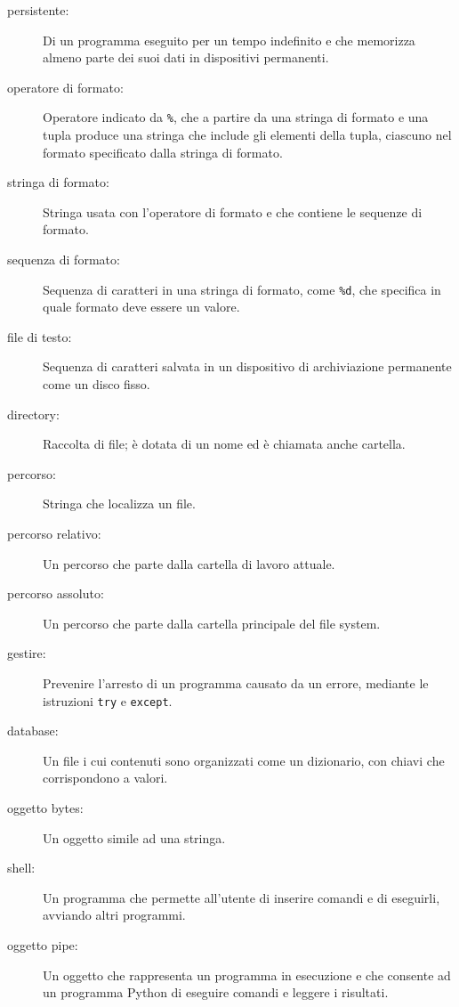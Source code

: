 \documentclass[10pt]{book}
\begin{document}
\begin{description}

\item[persistente:] Di un programma eseguito per un tempo indefinito e che memorizza almeno parte dei suoi dati in dispositivi permanenti.

\item[operatore di formato:] Operatore indicato da {\tt \%}, che a partire da una stringa di formato e una tupla produce una stringa che include gli elementi della tupla, ciascuno nel formato specificato dalla stringa di formato.

\item[stringa di formato:] Stringa usata con l'operatore di formato e che contiene le sequenze di formato.  

\item[sequenza di formato:] Sequenza di caratteri in una stringa di formato, come {\tt \%d}, che specifica in quale formato deve essere un valore.

\item[file di testo:] Sequenza di caratteri salvata in un dispositivo di archiviazione permanente come un disco fisso.

\item[directory:] Raccolta di file; è dotata di un nome ed è chiamata anche cartella.

\item[percorso:] Stringa che localizza un file.

\item[percorso relativo:] Un percorso che parte dalla cartella di lavoro attuale.

\item[percorso assoluto:] Un percorso che parte dalla cartella principale del file system.

\item[gestire:] Prevenire l'arresto di un programma causato da un errore, mediante le istruzioni {\tt try}
e {\tt except}.

\item[database:] Un file i cui contenuti sono organizzati come un dizionario, con chiavi che corrispondono a valori.

\item[oggetto bytes:] Un oggetto simile ad una stringa.

\item[shell:] Un programma che permette all'utente di inserire comandi e di eseguirli, avviando altri programmi.

\item[oggetto pipe:] Un oggetto che rappresenta un programma in esecuzione e che consente ad un programma Python di eseguire comandi e leggere i risultati.

\end{description}
\end{document}
